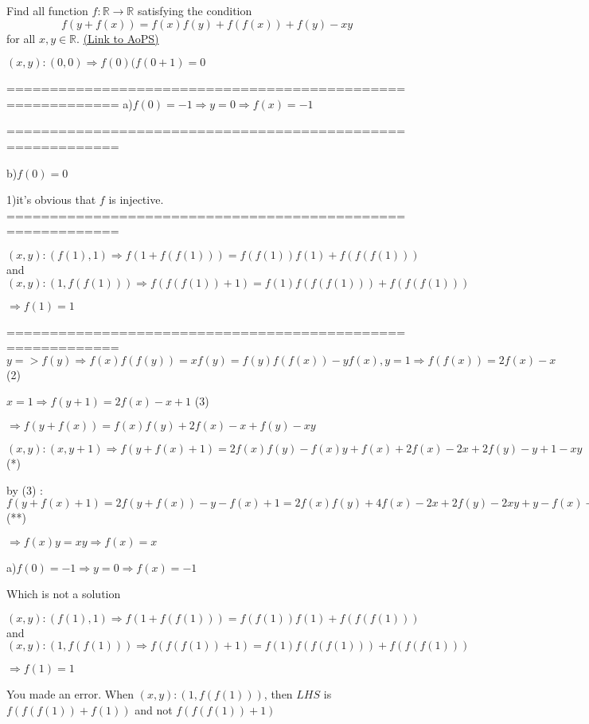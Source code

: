\begin{problem}
	Find all function $ f: \mathbb R\to \mathbb R$ satisfying the condition
\[f(y+f(x))=f(x)f(y)+f(f(x))+f(y)-xy\]
for all $x, y \in \mathbb R$.
	\flushright \href{https://artofproblemsolving.com/community/c6h403064}{(Link to AoPS)}
\end{problem}



\begin{solution}
	$(x,y):(0,0)\Longrightarrow f(0)(f(0+1)=0$

===========================================================
a)$f(0)=-1\Longrightarrow y=0 \Longrightarrow f(x)=-1$

===========================================================

b)$f(0)=0$

1)it's obvious that $f$ is injective.
===========================================================

$(x,y):(f(1),1)\Longrightarrow f(1+f(f(1)))=f(f(1))f(1)+f(f(f(1))) $ and $(x,y):(1,f(f(1)))\Longrightarrow f(f(f(1))+1)=f(1)f(f(f(1)))+f(f(f(1)))$

$\Longrightarrow f(1)=1$

===========================================================
$y=>f(y)\Longrightarrow f(x)f(f(y))=xf(y)=f(y)f(f(x))-yf(x) , y=1 \Longrightarrow f(f(x))=2f(x)-x $ (2)

$x=1\Longrightarrow f(y+1)=2f(x)-x+1$ (3)

$\Longrightarrow f(y+f(x))=f(x)f(y)+2f(x)-x+f(y)-xy$ 

$(x,y):(x,y+1)\Longrightarrow f(y+f(x)+1)=2f(x)f(y)-f(x)y+f(x)+2f(x)-2x+2f(y)-y+1-xy$ (*)

by (3) :
$f(y+f(x)+1)=2f(y+f(x))-y-f(x)+1=2f(x)f(y)+4f(x)-2x+2f(y)-2xy+y-f(x)+1$ (**)

$\Longrightarrow f(x)y=xy\Longrightarrow f(x)=x$
\end{solution}



\begin{solution}
	\begin{tcolorbox} a)$f(0)=-1\Longrightarrow y=0 \Longrightarrow f(x)=-1$
\end{tcolorbox}
Which is not a solution

\begin{tcolorbox}$(x,y):(f(1),1)\Longrightarrow f(1+f(f(1)))=f(f(1))f(1)+f(f(f(1))) $ and $(x,y):(1,f(f(1)))\Longrightarrow f(f(f(1))+1)=f(1)f(f(f(1)))+f(f(f(1)))$

$\Longrightarrow f(1)=1$\end{tcolorbox}
You made an error. When $(x,y):(1,f(f(1)))$, then $LHS$ is $f(f(f(1))+f(1))$ and not $f(f(f(1))+1)$
\end{solution}



